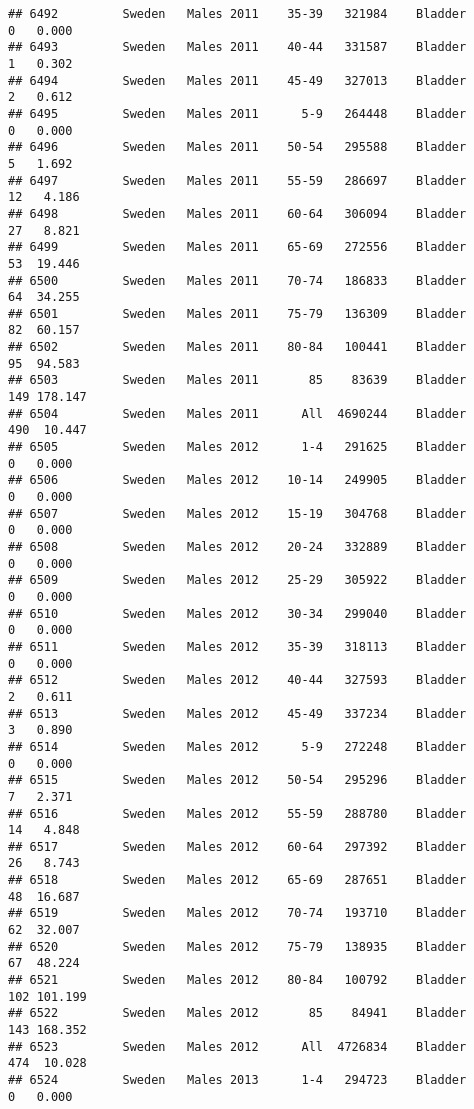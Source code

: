 \documentclass[
]{article}
\begin{document}
\begin{verbatim}
## 6492         Sweden   Males 2011    35-39   321984    Bladder      0   0.000
## 6493         Sweden   Males 2011    40-44   331587    Bladder      1   0.302
## 6494         Sweden   Males 2011    45-49   327013    Bladder      2   0.612
## 6495         Sweden   Males 2011      5-9   264448    Bladder      0   0.000
## 6496         Sweden   Males 2011    50-54   295588    Bladder      5   1.692
## 6497         Sweden   Males 2011    55-59   286697    Bladder     12   4.186
## 6498         Sweden   Males 2011    60-64   306094    Bladder     27   8.821
## 6499         Sweden   Males 2011    65-69   272556    Bladder     53  19.446
## 6500         Sweden   Males 2011    70-74   186833    Bladder     64  34.255
## 6501         Sweden   Males 2011    75-79   136309    Bladder     82  60.157
## 6502         Sweden   Males 2011    80-84   100441    Bladder     95  94.583
## 6503         Sweden   Males 2011       85    83639    Bladder    149 178.147
## 6504         Sweden   Males 2011      All  4690244    Bladder    490  10.447
## 6505         Sweden   Males 2012      1-4   291625    Bladder      0   0.000
## 6506         Sweden   Males 2012    10-14   249905    Bladder      0   0.000
## 6507         Sweden   Males 2012    15-19   304768    Bladder      0   0.000
## 6508         Sweden   Males 2012    20-24   332889    Bladder      0   0.000
## 6509         Sweden   Males 2012    25-29   305922    Bladder      0   0.000
## 6510         Sweden   Males 2012    30-34   299040    Bladder      0   0.000
## 6511         Sweden   Males 2012    35-39   318113    Bladder      0   0.000
## 6512         Sweden   Males 2012    40-44   327593    Bladder      2   0.611
## 6513         Sweden   Males 2012    45-49   337234    Bladder      3   0.890
## 6514         Sweden   Males 2012      5-9   272248    Bladder      0   0.000
## 6515         Sweden   Males 2012    50-54   295296    Bladder      7   2.371
## 6516         Sweden   Males 2012    55-59   288780    Bladder     14   4.848
## 6517         Sweden   Males 2012    60-64   297392    Bladder     26   8.743
## 6518         Sweden   Males 2012    65-69   287651    Bladder     48  16.687
## 6519         Sweden   Males 2012    70-74   193710    Bladder     62  32.007
## 6520         Sweden   Males 2012    75-79   138935    Bladder     67  48.224
## 6521         Sweden   Males 2012    80-84   100792    Bladder    102 101.199
## 6522         Sweden   Males 2012       85    84941    Bladder    143 168.352
## 6523         Sweden   Males 2012      All  4726834    Bladder    474  10.028
## 6524         Sweden   Males 2013      1-4   294723    Bladder      0   0.000

\end{verbatim}
\end{document}
